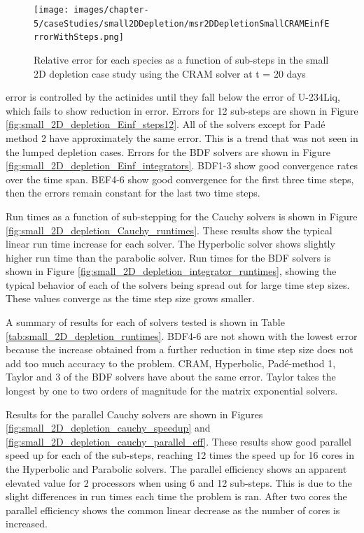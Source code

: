 \clearpage

\begin{landscape}
\thispagestyle{mylandscape}
\begin{figure}[p]
    \centering
    \texttt{[image: images/chapter-5/caseStudies/small2DDepletion/msr2DDepletionSmallCRAMEinfErrorWithSteps.png]}
    \caption{Relative error for each species as a function of sub-steps in the small 2D depletion case study using the CRAM solver at t = 20 days}
    \label{fig:small_2D_depletion_Einf_species_with_substeps}
\end{figure}
\end{landscape}

\clearpage

\noindent error is controlled by the actinides until they fall below the error of U-234Liq, which fails to show reduction in error. Errors for 12 sub-steps are shown in Figure \ref{fig:small_2D_depletion_Einf_steps12}. All of the solvers except for Pad\'e method 2 have approximately the same error. This is a trend that was not seen in the lumped depletion cases. Errors for the BDF solvers are shown in Figure \ref{fig:small_2D_depletion_Einf_integrators}. BDF1-3 show good convergence rates over the time span. BEF4-6 show good convergence for the first three time steps, then the errors remain constant for the last two time steps. 

Run times as a function of sub-stepping for the Cauchy solvers is shown in Figure \ref{fig:small_2D_depletion_Cauchy_runtimes}. These results show the typical linear run time increase for each solver. The Hyperbolic solver shows slightly higher run time than the parabolic solver. Run times for the BDF solvers is shown in Figure \ref{fig:small_2D_depletion_integrator_runtimes}, showing the typical behavior of each of the solvers being spread out for large time step sizes. These values converge as the time step size grows smaller. 

A summary of results for each of solvers tested is shown in Table \ref{tab:small_2D_depletion_runtimes}. BDF4-6 are not shown with the lowest error because the increase obtained from a further reduction in time step size does not add too much accuracy to the problem. CRAM, Hyperbolic, Pad\'e-method 1, Taylor and 3 of the BDF solvers have about the same error. Taylor takes the longest by one to two orders of magnitude for the matrix exponential solvers. 

Results for the parallel Cauchy solvers are shown in Figures \ref{fig:small_2D_depletion_cauchy_speedup} and \ref{fig:small_2D_depletion_cauchy_parallel_eff}. These results show good parallel speed up for each of the sub-steps, reaching 12 times the speed up for 16 cores in the Hyperbolic and Parabolic solvers. The parallel efficiency shows an apparent elevated value for 2 processors when using 6 and 12 sub-steps. This is due to the slight differences in run times each time the problem is ran. After two cores the parallel efficiency shows the common linear decrease as the number of cores is increased. 


